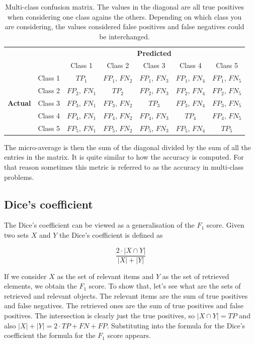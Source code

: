 \begin{table}[ht]
\centering
\caption{Multi-class confusion matrix. The values in the diagonal are all true positives when considering one class agains the others. Depending on which class you are considering, the values considered false positives and false negatives could be interchanged.}
\begin{tabular}{c c c|c|c|c|c|}
& & \multicolumn{5}{c}{\textbf{Predicted}} \\ \cline{3-7}
& & \multicolumn{1}{|c|}{Class 1} & Class 2 & Class 3 & Class 4 & Class 5 \\ \cline{2-7}
\multirow{5}{*}{\textbf{Actual}} 
 & \multicolumn{1}{|c|}{Class 1} & $TP_1$ & $FP_1$, $FN_2$ & $FP_1$, $FN_3$ & $FP_1$, $FN_4$ & $FP_1$, $FN_5$ \\ \cline{2-7}
 & \multicolumn{1}{|c|}{Class 2} & $FP_2$, $FN_1$ & $TP_2$ & $FP_2$, $FN_3$ & $FP_2$, $FN_4$ & $FP_2$, $FN_5$ \\ \cline{2-7}
 & \multicolumn{1}{|c|}{Class 3} & $FP_3$, $FN_1$ & $FP_3$, $FN_2$ & $TP_3$ & $FP_3$, $FN_4$ & $FP_3$, $FN_5$ \\ \cline{2-7}
 & \multicolumn{1}{|c|}{Class 4} & $FP_4$, $FN_1$ & $FP_4$, $FN_2$ & $FP_4$, $FN_3$ & $TP_4$ & $FP_4$, $FN_5$ \\ \cline{2-7}
 & \multicolumn{1}{|c|}{Class 5} & $FP_5$, $FN_1$ & $FP_5$, $FN_2$ & $FP_5$, $FN_3$ & $FP_5$, $FN_4$ & $TP_5$ \\ \cline{2-7}
\end{tabular}
\label{table:confusion_matrix3}
\end{table}

The micro-average is then the sum of the diagonal divided by the sum of all the entries in the matrix. It is quite similar to how the accuracy is computed. For that reason sometimes this metric is referred to as the accuracy in multi-class problems.

\newpage
\subsection{Dice's coefficient}

The Dice's coefficient can be viewed as a generalisation of the $F_1$ score. Given two sets $X$ and $Y$ the Dice's coefficient is defined as 

\begin{equation}
    \frac{2\cdot |X \cap Y|}{|X| + |Y|}
\end{equation}

If we consider $X$ as the set of relevant items and $Y$ as the set of retrieved elements, we obtain the $F_1$ score. To show that, let's see what are the sets of retrieved and relevant objects. The relevant items are the sum of true positives and false negatives. The retrieved ones are the sum of true positives and false positives. The intersection is clearly just the true positives, so $|X\cap Y| = TP$ and also $|X|+|Y|=2\cdot TP + FN + FP$. Substituting into the formula for the Dice's coefficient the formula for the $F_1$ score appears.

